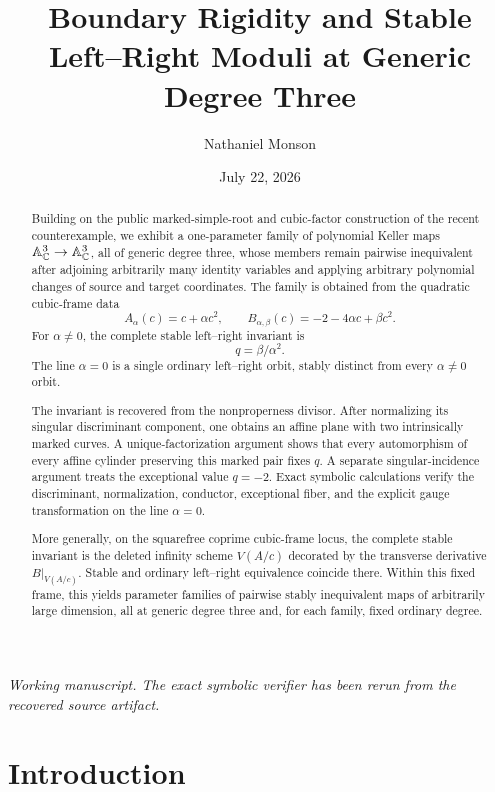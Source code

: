 \documentclass[11pt,reqno]{amsart}
\title[Boundary rigidity and stable moduli]{Boundary Rigidity and Stable
Left--Right Moduli at Generic Degree Three}
\author{Nathaniel Monson}
\date{July 22, 2026}
\begin{document}
\begin{abstract}
Building on the public marked-simple-root and cubic-factor construction of
the recent counterexample, we exhibit a one-parameter family of polynomial Keller maps
\(\mathbb A^3_{\mathbb C}\to\mathbb A^3_{\mathbb C}\), all of generic degree three, whose members remain
pairwise inequivalent after adjoining arbitrarily many identity variables and
applying arbitrary polynomial changes of source and target coordinates.
The family is obtained from the quadratic cubic-frame data
\[
A_\alpha(c)=c+\alpha c^2,\qquad
B_{\alpha,\beta}(c)=-2-4\alpha c+\beta c^2.
\]
For \(\alpha\ne0\), the complete stable left--right invariant is
\[
q=\beta/\alpha^2.
\]
The line \(\alpha=0\) is a single ordinary left--right orbit, stably distinct
from every \(\alpha\ne0\) orbit.

The invariant is recovered from the nonproperness divisor.  After normalizing
its singular discriminant component, one obtains an affine plane with two
intrinsically marked curves.  A unique-factorization argument
shows that every automorphism of every affine cylinder preserving this marked
pair fixes \(q\).  A separate singular-incidence argument treats the
exceptional value \(q=-2\).  Exact symbolic calculations verify the
discriminant, normalization, conductor, exceptional fiber, and the explicit
gauge transformation on the line \(\alpha=0\).

More generally, on the squarefree coprime cubic-frame locus, the complete
stable invariant is the deleted infinity scheme \(V(A/c)\) decorated by the
transverse derivative \(B|_{V(A/c)}\).  Stable and ordinary left--right
equivalence coincide there.  Within this fixed frame, this yields parameter
families of pairwise stably inequivalent maps of arbitrarily large dimension,
all at generic degree three and, for each family, fixed ordinary degree.
\end{abstract}

\maketitle

\begin{center}
\small\emph{Working manuscript.  The exact symbolic verifier has been rerun
from the recovered source artifact.}
\end{center}

\section{Introduction}
\label{sec:introduction}
\end{document}
